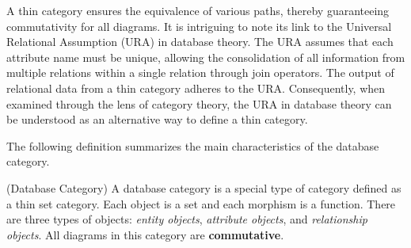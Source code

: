 



 A thin category ensures the equivalence of various paths, thereby guaranteeing commutativity for all diagrams. It is intriguing to note its link to the Universal Relational Assumption (URA) \cite{DBLP:conf/pods/KuckS82,DBLP:conf/pods/SteinM85} in database theory. The URA assumes that each attribute name must be unique, allowing the consolidation of all information from multiple relations within a single relation through join operators. The output of relational data from a thin category adheres to the URA. Consequently, when examined through the lens of category theory, the URA in database theory can be understood as an alternative way to define a thin category.
 
The following definition summarizes the main characteristics of the database category.
 
 
 




\begin{definition}(Database Category) A database category is a special type of category defined as a thin set category. Each object is a set and each morphism is a function. There are three types of objects: \textit{entity objects}, \textit{attribute objects}, and \textit{relationship objects}. All diagrams in this category are \textbf{commutative}. \end{definition}



